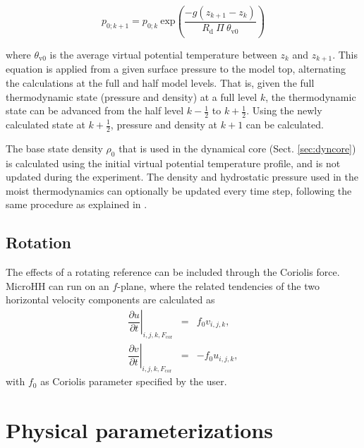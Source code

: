 \documentclass[gmd,manuscript]{copernicus}
\begin{document}
\begin{equation}
p_{0;k+1} = p_{0;k} ~ \mathrm{exp}\left(\frac{-g (z_{k+1}-z_k)}{R_\mathrm{d} ~ \Pi ~ \theta_\mathrm{v0}} \right )
\end{equation}

\noindent where $\theta_\mathrm{v0}$ is the average virtual potential temperature between $z_k$ and $z_{k+1}$. This equation is applied from a given surface pressure to the model top, alternating the calculations at the full and half model levels. That is, given the full thermodynamic state (pressure and density) at a full level $k$, the thermodynamic state can be advanced from the half level $k-\frac{1}{2}$ to $k+\frac{1}{2}$. Using the newly calculated state at $k+\frac{1}{2}$, pressure and density at $k+1$ can be calculated. 

The base state density $\rho_0$ that is used in the dynamical core (Sect. \ref{sec:dyncore}) is calculated using the initial virtual potential temperature profile, and is not updated during the experiment. The density and hydrostatic pressure used in the moist thermodynamics can optionally be updated every time step, following the same procedure as explained in \citet{Boing2014}.

\subsection{Rotation}
The effects of a rotating reference can be included through the Coriolis force. MicroHH can run on an $f$-plane, where the related tendencies of the two horizontal velocity components are calculated as
\begin{eqnarray}
\left. \dfrac{\partial u}{\partial t}\right|_{i,j,k,F_\textrm{cor}} & = & f_0 v_{i,j,k},\\
\left. \dfrac{\partial v}{\partial t}\right|_{i,j,k,F_\textrm{cor}} & = & -f_0 u_{i,j,k},
\end{eqnarray}
with $f_0$ as Coriolis parameter specified by the user.

\section{Physical parameterizations}\label{sec:parametrizations}
\end{document}
